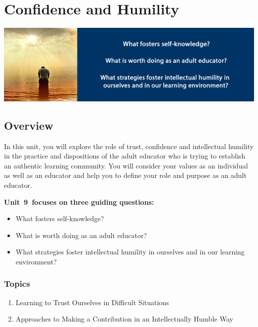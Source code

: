 \documentclass[
]{book}
\providecommand{\tightlist}{%
  \setlength{\itemsep}{0pt}\setlength{\parskip}{0pt}}
\begin{document}
\hypertarget{confidence-and-humility}{%
\chapter{Confidence and Humility}\label{confidence-and-humility}}

\includegraphics{assets/unit9/BannerUnit9.jpg}

\hypertarget{overview-8}{%
\section*{Overview}\label{overview-8}}

In this unit, you will explore the role of trust, confidence and intellectual humility in the practice and dispositions of the adult educator who is trying to establish an authentic learning community. You will consider your values as an individual as well as an educator and help you to define your role and purpose as an adult educator.

\textbf{Unit~9~focuses on three guiding questions:}

\begin{itemize}
\tightlist
\item
  What fosters self-knowledge?\\
\item
  What is worth doing as an adult educator?
\item
  What strategies foster intellectual humility in ourselves and in our learning environment?
\end{itemize}

\hypertarget{topics-8}{%
\subsection*{Topics}\label{topics-8}}

\begin{enumerate}
\def\labelenumi{\arabic{enumi}.}
\tightlist
\item
  Learning to Trust Ourselves in Difficult Situations\\
\item
  Approaches to Making a Contribution in an Intellectually Humble Way
\end{enumerate}
\end{document}

